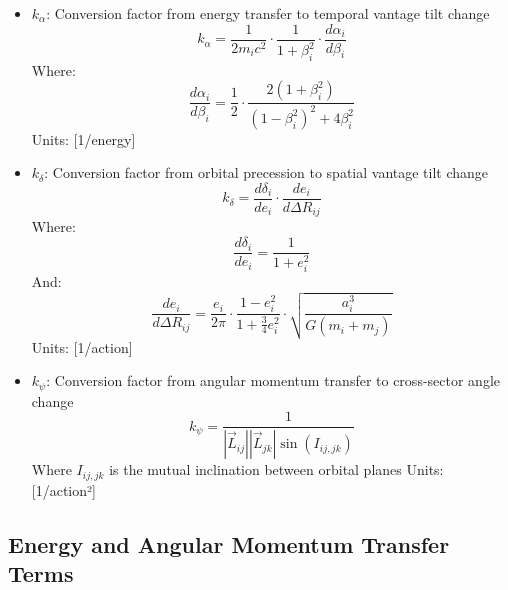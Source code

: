 \documentclass{article}
\begin{document}
\begin{itemize}
\item $k_\alpha$: Conversion factor from energy transfer to temporal vantage tilt change
    \begin{equation}
    k_\alpha = \frac{1}{2m_ic^2} \cdot \frac{1}{1+\beta_i^2} \cdot \frac{d\alpha_i}{d\beta_i}
    \end{equation}
    Where:
    \begin{equation}
    \frac{d\alpha_i}{d\beta_i} = \frac{1}{2} \cdot \frac{2(1+\beta_i^2)}{(1-\beta_i^2)^2 + 4\beta_i^2}
    \end{equation}
    Units: [1/energy]
    
\item $k_\delta$: Conversion factor from orbital precession to spatial vantage tilt change
    \begin{equation}
    k_\delta = \frac{d\delta_i}{de_i} \cdot \frac{de_i}{d\Delta R_{ij}}
    \end{equation}
    Where:
    \begin{equation}
    \frac{d\delta_i}{de_i} = \frac{1}{1+e_i^2}
    \end{equation}
    And:
    \begin{equation}
    \frac{de_i}{d\Delta R_{ij}} = \frac{e_i}{2\pi} \cdot \frac{1-e_i^2}{1+\frac{3}{4}e_i^2} \cdot \sqrt{\frac{a_i^3}{G(m_i+m_j)}}
    \end{equation}
    Units: [1/action]
    
\item $k_\psi$: Conversion factor from angular momentum transfer to cross-sector angle change
    \begin{equation}
    k_\psi = \frac{1}{|\vec{L}_{ij}||\vec{L}_{jk}|\sin(I_{ij,jk})}
    \end{equation}
    Where $I_{ij,jk}$ is the mutual inclination between orbital planes
    Units: [1/action²]
\end{itemize}

\subsection{Energy and Angular Momentum Transfer Terms}
\end{document}
